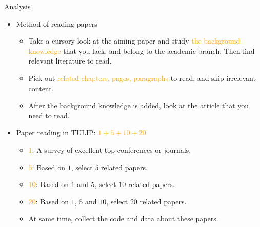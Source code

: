 \documentclass[
 size=14pt,
 paper=smartboard,  %
 mode=present, 		%
 display=slides, 	%
 style=tuliplab,  	%
 pauseslide,
 fleqn,leqno]{powerdot}{}
\begin{document}
\begin{slide}{Analysis}

\begin{itemize}
    \item Method of reading papers
    \begin{itemize}
      \item Take a cursory look at the aiming paper and study \textcolor{orange}{the background knowledge} that you lack, and belong to the academic branch. Then find relevant literature to read.
      \item Pick out \textcolor{orange}{related chapters, pages, paragraphs} to read, and skip irrelevant content.
      \item After the background knowledge is added, look at the article that you need to read.
    \end{itemize}
    \item Paper reading in TULIP: \textcolor{orange}{$1+5+10+20$}
      \begin{itemize}
        \item \textcolor{orange}{$1$}: A survey of excellent top conferences or journals.
        \item \textcolor{orange}{$5$}: Based on $1$, select $5$ related papers.
        \item \textcolor{orange}{$10$}: Based on $1$ and $5$, select $10$ related papers.
        \item \textcolor{orange}{$20$}: Based on $1$, $5$ and $10$, select $20$ related papers.
        \item At same time, collect the code and data about these papers.
      \end{itemize}
\end{itemize}
\end{slide}
\end{document}

